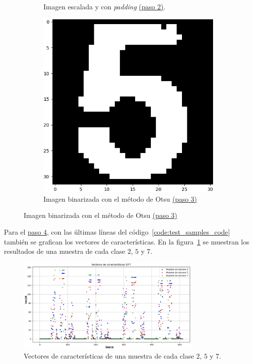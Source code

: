 \begin{figure}[hb!]
\begin{subfigure}[t]{0.48\textwidth}
        \caption{Imagen escalada y con \emph{padding} \hyperref[sec:padding]{(paso 2)}.}
    \end{subfigure}
    \hfill
    \begin{subfigure}[t]{0.48\textwidth}
        \centering
        \includegraphics[height=\x1cm]{3_Reconocimiento/Figs/train_sample5_otsu}
        \caption{Imagen binarizada con el método de Otsu \hyperref[sec:segmentation]{(paso 3)}}
    \end{subfigure}
\end{figure}

Para el \hyperref[sec:sift_descriptor]{paso 4}, con las últimas líneas del código~\ref{code:test_samples_code} también se grafican los vectores de características.
En la figura~\ref{fig:train_samples_features} se muestran los resultados de una muestra de cada clase $2$, $5$ y $7$.
%
\begin{figure}[h]
    \caption{Vectores de características de una muestra de cada clase $2$, $5$ y $7$.}
    \label{fig:train_samples_features}
    \centering
    \includegraphics[width=0.8\textwidth]{3_Reconocimiento/Figs/train_samples_features}
\end{figure}

